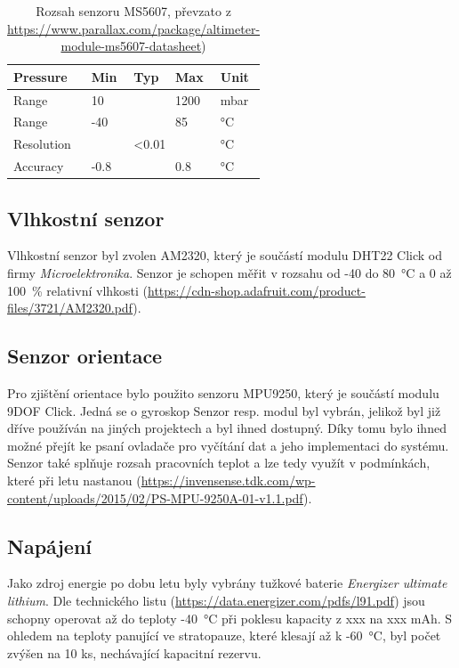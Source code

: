 \documentclass[twoside]{ctuthesis}
\theoremstyle{plain}
\theoremstyle{definition}
\theoremstyle{note}
\begin{document}
		\begin{table}[]
			\begin{tabular}{|l|lll|l|}
			\hline
			Pressure   & \multicolumn{1}{l|}{Min}  & \multicolumn{1}{l|}{Typ} & Max  & Unit \\ \hline
			Range      & \multicolumn{1}{l|}{10}   & \multicolumn{1}{l|}{}    & 1200 & mbar \\ \hline
			Range      & \multicolumn{1}{l|}{-40}  & \multicolumn{1}{l|}{}    & 85   & °C   \\ \hline
			Resolution & \multicolumn{3}{c|}{\textless{}0.01}                        & °C   \\ \hline
			Accuracy   & \multicolumn{1}{l|}{-0.8} & \multicolumn{1}{l|}{}    & 0.8  & °C   \\ \hline
			\end{tabular}
			\caption{Rozsah senzoru MS5607, převzato z \url{https://www.parallax.com/package/altimeter-module-ms5607-datasheet})}
			\label{tab:ms:range}
		\end{table}

		
		\subsection{Vlhkostní senzor}
		Vlhkostní senzor byl zvolen AM2320, který je součástí modulu DHT22 Click od firmy \textit{Microelektronika}. Senzor je schopen měřit v rozsahu od -40 do 80~°C a 0 až 100~\% relativní vlhkosti (\url{https://cdn-shop.adafruit.com/product-files/3721/AM2320.pdf}). 

		\subsection{Senzor orientace}
		Pro zjištění orientace bylo použito senzoru MPU9250, který je součástí modulu 9DOF Click. Jedná se o gyroskop Senzor resp. modul byl vybrán, jelikož byl již dříve používán na jiných projektech a byl ihned dostupný. Díky tomu bylo ihned možné přejít ke psaní ovladače pro vyčítání dat a jeho implementaci do systému. Senzor také splňuje rozsah pracovních teplot a lze tedy využít v podmínkách, které při letu nastanou (\url{https://invensense.tdk.com/wp-content/uploads/2015/02/PS-MPU-9250A-01-v1.1.pdf}).  
		
		
		\subsection{Napájení}
		Jako zdroj energie po dobu letu byly vybrány tužkové baterie \textit{Energizer ultimate lithium}. Dle technického listu (\url{https://data.energizer.com/pdfs/l91.pdf}) jsou schopny operovat až do teploty -40~°C při poklesu kapacity z xxx na xxx mAh. S ohledem na teploty panující ve stratopauze, které klesají až k -60~°C, byl počet zvýšen na 10 ks, nechávající kapacitní rezervu. 
\end{document}
